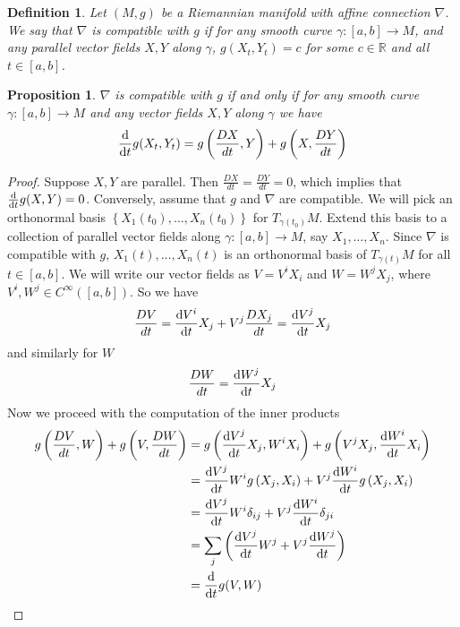 \documentclass[a4paper]{article}
\newtheorem*{prop}{Proposition}
\newtheorem*{defn}{Definition}
\begin{document}
\begin{defn}
  Let $(M,g)$ be a Riemannian manifold with affine connection $\nabla$. We say that $\nabla$ is compatible with $g$ if for any smooth curve $\gamma: [a,b] \rightarrow M$, and any parallel vector fields $X,Y$ along $\gamma$, $g(X_t,Y_t) = c$ for some $c \in \mathds{R}$ and all $t \in [a,b]$. 
\end{defn}

\begin{prop}
  $\nabla$ is compatible with $g$ if and only if for any smooth curve $\gamma: [a,b] \rightarrow M$ and any vector fields $X,Y$ along $\gamma$ we have 
  \[
    \dv{t} g(X_t, Y_t)  = g \left( \frac{DX}{dt}, Y \right) + g \left( X, \frac{DY}{dt} \right)
  \]
\end{prop}

\begin{proof}
  Suppose $X,Y$ are parallel.  Then $\frac{DX}{dt} = \frac{DY}{dt} = 0$, which implies that $\dv{t} g(X,Y) = 0$. Conversely, assume that $g$ and $\nabla$ are compatible. We will pick an orthonormal basis $\left\{ X_1(t_0), \dots, X_n(t_0) \right\}$ for $T_{\gamma(t_0)}M$. Extend this basis to a collection of parallel vector fields along $\gamma: [a,b] \rightarrow M$, say $X_1, \dots, X_n$. Since $\nabla$ is compatible with $g$, $X_1(t), \dots, X_n(t)$ is an orthonormal basis of $T_{\gamma(t)}M$ for all $t \in [a,b]$. We will write our vector fields as $V = V^iX_i$ and $W = W^jX_j$, where $V^i, W^j \in C^{\infty}([a,b])$. So we have
  \[
    \frac{DV}{dt} = \dv{V^i}{t}X_j + V^j \frac{DX_j}{dt} = \dv{V^j}{t}X_j
  \]
  and similarly for $W$
  \[
    \frac{DW}{dt} = \dv{W^j}{t}X_j
  \]
  Now we proceed with the computation of the inner products
  \[
    \begin{aligned}
      g \left( \frac{DV}{dt}, W \right) + g \left( V, \frac{DW}{dt} \right) &= g \left( \dv{V^j}{t} X_j, W^iX_i \right) + g \left( V^jX_j, \dv{W^i}{t} X_i \right) \\
                                                                            &= \dv{V^j}{t}W^ig \left(X_j, X_i \right) + V^j \dv{W^i}{t}g \left(X_j, X_i \right) \\
                                                                            &= \dv{V^j}{t}W^i\delta_{ij}+ V^j \dv{W^i}{t}\delta_{ji} \\
                                                                            &= \sum_j \left( \dv{V^j}{t} W^j + V^j \dv{W^j}{t} \right) \\
                                                                            &= \dv{t} g(V,W)
    \end{aligned}
  \]
\end{proof}
\end{document}
